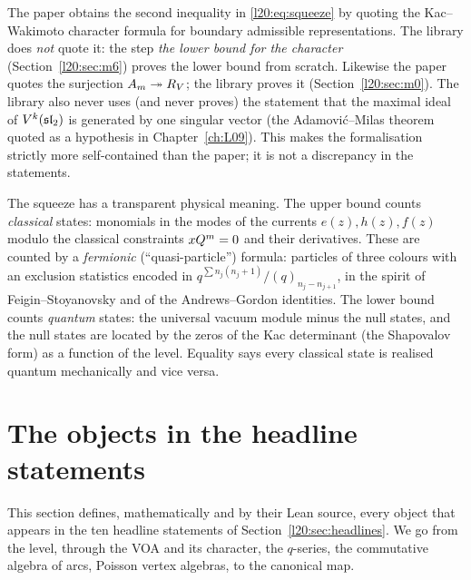 \begin{warning}[title={Where the library departs from the paper}]
The paper obtains the second inequality in \eqref{l20:eq:squeeze} by quoting the Kac--Wakimoto character
formula for boundary admissible representations. The library does \emph{not} quote it: the step \emph{the lower bound for the character} (Section~\ref{l20:sec:m6}) proves the
lower bound from scratch. Likewise the paper quotes the surjection $A_m\twoheadrightarrow R_V$; the
library proves it (Section~\ref{l20:sec:m0}). The library also never uses (and never proves) the statement that the maximal ideal
of $V^k(\mathfrak{sl}_2)$ is generated by one singular vector (the Adamovi\'c--Milas theorem quoted as a hypothesis
in Chapter~\ref{ch:L09}). This makes the formalisation strictly more self-contained than the paper; it is not
a discrepancy in the statements.
\end{warning}

\begin{physics}
The squeeze has a transparent physical meaning. The upper bound counts \emph{classical} states: monomials in
the modes of the currents $e(z),h(z),f(z)$ modulo the classical constraints $xQ^m=0$ and their
derivatives. These are counted by a \emph{fermionic} (``quasi-particle'') formula: particles of three
colours with an exclusion statistics encoded in $q^{\sum n_j(n_j+1)}/(q)_{n_j-n_{j+1}}$, in the spirit of
Feigin--Stoyanovsky and of the Andrews--Gordon identities. The lower bound counts \emph{quantum} states: the
universal vacuum module minus the null states, and the null states are located by the zeros of the Kac
determinant (the Shapovalov form) as a function of the level. Equality says every classical state is realised
quantum mechanically and vice versa.
\end{physics}

\section{The objects in the headline statements}\label{l20:sec:objects}

This section defines, mathematically and by their Lean source, every object that appears in the ten
headline statements of Section~\ref{l20:sec:headlines}. We go from the level, through the VOA and its
character, the $q$-series, the commutative algebra of arcs, Poisson vertex algebras, to the canonical
map.

